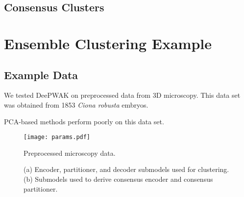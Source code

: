 \subsection{Consensus Clusters}
\label{app:consensus}

\section{Ensemble Clustering Example}
\label{app:ensemble}

\subsection{Example Data}
We tested DeePWAK on preprocessed data from 3D microscopy.
This data set was obtained from 1853 \textit{Ciona robusta} embryos.

PCA-based methods perform poorly on this data set.


\begin{figure}
  \texttt{[image: params.pdf]}
    \caption{Preprocessed microscopy data. }
    \label{fig:params}
\end{figure}

\begin{figure}
     \begin{subfigure}[b]{0.5\textwidth}
        
         \caption{}
         \label{fig:}
     \end{subfigure}
     \hfill
     \begin{subfigure}[b]{\textwidth}
        
        \caption{}
        \label{fig:}
     \end{subfigure}

     \caption{
       (a) Encoder, partitioner, and decoder submodels used for clustering.
       (b) Submodels used to derive consensus encoder and consensus partitioner.
     }
\end{figure}

